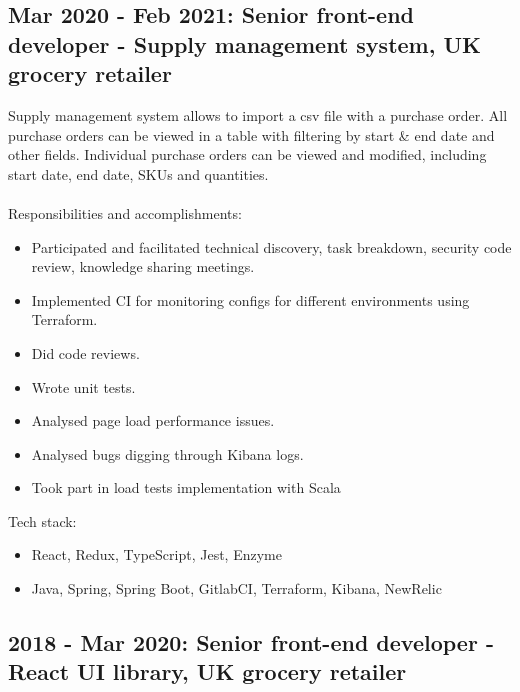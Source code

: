 \documentclass[a4paper, 14pt]{article}
\begin{document}
  \subsection{Mar 2020 - Feb 2021: Senior front-end developer - Supply management system, UK grocery retailer}
  Supply management system allows to import a csv file with a purchase order. All purchase orders can be viewed in a table with filtering by start \& end date and other fields. Individual purchase orders can be viewed and modified, including start date, end date, SKUs and quantities. \\
  \\
  Responsibilities and accomplishments:
    \begin{itemize}
      \item Participated and facilitated technical discovery, task breakdown, security code review, knowledge sharing meetings. \\
      \item Implemented CI for monitoring configs for different environments using Terraform. \\
      \item Did code reviews. \\
      \item Wrote unit tests. \\
      \item Analysed page load performance issues. \\
      \item Analysed bugs digging through Kibana logs. \\
      \item Took part in load tests implementation with Scala
    \end{itemize}
  \bigskip
  Tech stack:
    \begin{itemize}
      \item React, Redux, TypeScript, Jest, Enzyme \\
      \item Java, Spring, Spring Boot, GitlabCI, Terraform, Kibana, NewRelic
    \end{itemize}

  \subsection{2018 - Mar 2020: Senior front-end developer - React UI library, UK grocery retailer}
\end{document}

